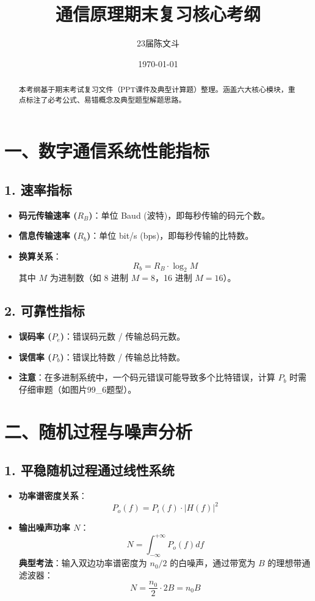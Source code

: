 \documentclass[12pt, a4paper]{article}
\title{\textbf{通信原理期末复习核心考纲}}
\author{23届陈文斗}
\date{\today}
\begin{document}
	
	\maketitle
	
	\begin{abstract}
		本考纲基于期末考试复习文件（PPT课件及典型计算题）整理。涵盖六大核心模块，重点标注了必考公式、易错概念及典型题型解题思路。
	\end{abstract}
	
	\tableofcontents
	\newpage
	
	\section{一、数字通信系统性能指标}
	\subsection{1. 速率指标}
	\begin{itemize}
		\item \textbf{码元传输速率 ($R_B$)}：单位 Baud (波特)，即每秒传输的码元个数。
		\item \textbf{信息传输速率 ($R_b$)}：单位 bit/s (bps)，即每秒传输的比特数。
		\item \textbf{换算关系}：
		\[
		R_b = R_B \cdot \log_2 M
		\]
		其中 $M$ 为进制数（如 8 进制 $M=8$，16 进制 $M=16$）。
	\end{itemize}
	
	\subsection{2. 可靠性指标}
	\begin{itemize}
		\item \textbf{误码率 ($P_e$)}：错误码元数 / 传输总码元数。
		\item \textbf{误信率 ($P_b$)}：错误比特数 / 传输总比特数。
		\item \textbf{注意}：在多进制系统中，一个码元错误可能导致多个比特错误，计算 $P_b$ 时需仔细审题（如图片99\_6题型）。
	\end{itemize}
	
	\section{二、随机过程与噪声分析}
	\subsection{1. 平稳随机过程通过线性系统}
	\begin{itemize}
		\item \textbf{功率谱密度关系}：
		\[
		P_o(f) = P_i(f) \cdot |H(f)|^2
		\]
		\item \textbf{输出噪声功率 $N$}：
		\[
		N = \int_{-\infty}^{+\infty} P_o(f) df
		\]
		\textbf{典型考法}：输入双边功率谱密度为 $n_0/2$ 的白噪声，通过带宽为 $B$ 的理想带通滤波器：
		\[
		N = \frac{n_0}{2} \cdot 2B = n_0 B
		\]
	\end{itemize}
	
\end{document}
